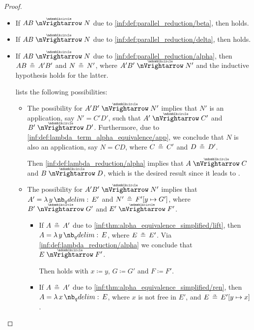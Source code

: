 \begin{proof}
\begin{itemize}
    \item If \( AB \ppred N \) due to \ref{inf:def:parallel_reduction/beta}, then  holds.

    \item If \( AB \ppred N \) due to \ref{inf:def:parallel_reduction/delta}, then  holds.

    \item If \( AB \ppred N \) due to \ref{inf:def:parallel_reduction/alpha}, then \( AB \aequiv A' B' \) and \( N \aequiv N' \), where \( A' B' \ppred N' \) and the inductive hypothesis holds for the latter.

     lists the following possibilities:
    \begin{itemize}
      \item The possibility  for \( A' B' \ppred N' \) implies that \( N' \) is an application, say \( N' = C' D' \), such that \( A' \ppred C' \) and \( B' \ppred D' \). Furthermore, due to \ref{inf:def:lambda_term_alpha_equivalence/app}, we conclude that \( N \) is also an application, say \( N = CD \), where \( C \aequiv C' \) and \( D \aequiv D' \).

      Then \ref{inf:def:lambda_reduction/alpha} implies that \( A \ppred C \) and \( B \ppred D \), which is the desired result since it leads to .

      \item The possibility  for \( A' B' \ppred N' \) implies that \( A' = \qabs y E' \) and \( N' \aequiv F'[y \mapsto G'] \), where \( B' \ppred G' \) and \( E' \ppred F' \).

      \begin{itemize}
        \item If \( A \aequiv A' \) due to \ref{inf:thm:alpha_equivalence_simplified/lift}, then \( A = \qabs y E \), where \( E \aequiv E' \). Via \ref{inf:def:lambda_reduction/alpha} we conclude that \( E \ppred F' \).

        Then  holds with \( x \coloneqq y \), \( G \coloneqq G' \) and \( F \coloneqq F' \).

        \item If \( A \aequiv A' \) due to \ref{inf:thm:alpha_equivalence_simplified/ren}, then \( A = \qabs x E \), where \( x \) is not free in \( E' \), and \( E \aequiv E'[y \mapsto x] \).


\end{itemize}
\end{itemize}
\end{itemize}
\end{proof}
